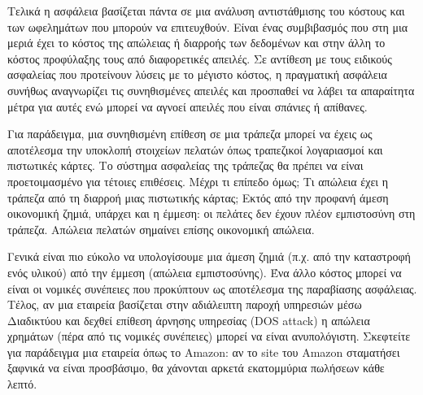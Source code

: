 Τελικά η ασφάλεια βασίζεται πάντα σε μια ανάλυση αντιστάθμισης του κόστους και των ωφελημάτων που μπορούν να επιτευχθούν. Είναι ένας συμβιβασμός που στη μια μεριά έχει το κόστος της απώλειας ή διαρροής των δεδομένων και στην άλλη το κόστος προφύλαξης τους από διαφορετικές απειλές. Σε αντίθεση με τους ειδικούς ασφαλείας που προτείνουν λύσεις με το μέγιστο κόστος, η πραγματική ασφάλεια συνήθως αναγνωρίζει τις συνηθισμένες απειλές και προσπαθεί να λάβει τα απαραίτητα μέτρα για αυτές ενώ μπορεί να αγνοεί απειλές που είναι σπάνιες ή απίθανες.

Για παράδειγμα, μια συνηθισμένη επίθεση σε μια τράπεζα μπορεί να έχεις ως αποτέλεσμα την υποκλοπή στοιχείων πελατών όπως τραπεζικοί λογαριασμοί και πιστωτικές κάρτες. Το σύστημα ασφαλείας της τράπεζας θα πρέπει να είναι προετοιμασμένο για τέτοιες επιθέσεις. Μέχρι τι επίπεδο όμως; Τι απώλεια έχει η τράπεζα από τη διαρροή μιας πιστωτικής κάρτας; Εκτός από την προφανή άμεση οικονομική ζημιά, υπάρχει και η έμμεση: οι πελάτες δεν έχουν πλέον εμπιστοσύνη στη τράπεζα. Απώλεια πελατών σημαίνει επίσης οικονομική απώλεια. 

Γενικά είναι πιο εύκολο να υπολογίσουμε μια άμεση ζημιά  (π.χ. από την καταστροφή ενός υλικού) από την έμμεση (απώλεια εμπιστοσύνης). Ένα άλλο κόστος μπορεί να είναι οι νομικές συνέπειες που προκύπτουν ως αποτέλεσμα της παραβίασης ασφάλειας. Τέλος, αν μια εταιρεία βασίζεται στην αδιάλειπτη παροχή υπηρεσιών μέσω Διαδικτύου και δεχθεί επίθεση άρνησης υπηρεσίας (DOS attack) η απώλεια χρημάτων (πέρα από τις νομικές συνέπειες) μπορεί να είναι ανυπολόγιστη. Σκεφτείτε για παράδειγμα μια εταιρεία όπως το Amazon: αν το site του Amazon σταματήσει ξαφνικά να είναι προσβάσιμο, θα χάνονται αρκετά εκατομμύρια πωλήσεων κάθε λεπτό.
 


